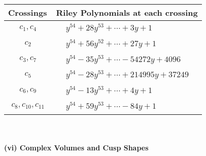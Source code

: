 \documentclass[1p]{elsarticle_modified}
\theoremstyle{definition}
\begin{document}
\begin{tabular}{m{50pt}|m{274pt}}
Crossings & \hspace{64pt}Riley Polynomials at each crossing \\
\hline $$\begin{aligned}c_{1},c_{4}\end{aligned}$$&$\begin{aligned}
&y^{54}+28 y^{53}+\cdots+3 y+1
\end{aligned}$\\
\hline $$\begin{aligned}c_{2}\end{aligned}$$&$\begin{aligned}
&y^{54}+56 y^{52}+\cdots+27 y+1
\end{aligned}$\\
\hline $$\begin{aligned}c_{3},c_{7}\end{aligned}$$&$\begin{aligned}
&y^{54}-35 y^{53}+\cdots-54272 y+4096
\end{aligned}$\\
\hline $$\begin{aligned}c_{5}\end{aligned}$$&$\begin{aligned}
&y^{54}-28 y^{53}+\cdots+214995 y+37249
\end{aligned}$\\
\hline $$\begin{aligned}c_{6},c_{9}\end{aligned}$$&$\begin{aligned}
&y^{54}-13 y^{53}+\cdots+4 y+1
\end{aligned}$\\
\hline $$\begin{aligned}c_{8},c_{10},c_{11}\end{aligned}$$&$\begin{aligned}
&y^{54}+59 y^{53}+\cdots-84 y+1
\end{aligned}$\\
\hline
\end{tabular}\\~\\
\newpage\flushleft \textbf{(vi) Complex Volumes and Cusp Shapes}
\end{document}
